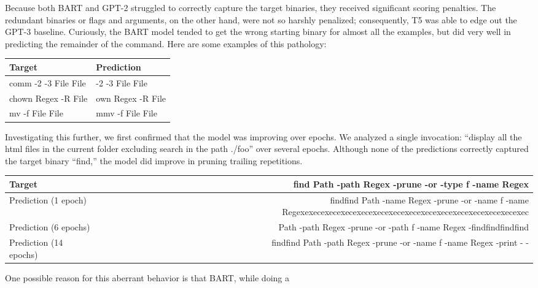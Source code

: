 Because both BART and GPT-2 struggled to correctly capture the target binaries,
they received significant scoring penalties. The redundant binaries or flags
and arguments, on the other hand, were not so harshly penalized; consequently,
T5 was able to edge out the GPT-3 baseline. Curiously, the BART model tended to
get the wrong starting binary for almost all the examples, but did very well in predicting the remainder of the command. Here are some examples of this pathology:
\begin{center}
	\begin{tabular}{ |O|O| }
		\hline
		\textbf{Target}      & \textbf{Prediction} \\
		\hline
		comm -2 -3 File File &
		-2 -3 File File                            \\
		\hline
		chown Regex -R File  &
		own Regex -R File                          \\
		\hline
		mv -f File File      & mmv -f File File    \\
		\hline
	\end{tabular}
\end{center}
Investigating this further, we first confirmed that the model was improving over epochs.
We analyzed a single invocation: ``display all the html files in the current
folder excluding search in the path ./foo'' over several epochs. Although none
of the predictions correctly captured the target binary ``find,'' the model did
improve in pruning trailing repetitions.
\begin{center}
	\begin{tabular}{|M|N|}
		\hline
		Target                 & find Path -path Regex -prune -or -type f -name Regex                                                             \\
		\hline
		Prediction (1 epoch)   & findfind Path -name Regex -prune -or -name f -name Regexexecexecexecexecexecexecexecexecexecexecexecexecexecexec \\
		\hline
		Prediction (6 epochs)  & Path -path Regex -prune -or -path f -name Regex -findfindfindfind                                                \\
		\hline
		Prediction (14 epochs) & findfind Path -path Regex -prune -or -name f -name Regex -print - -                                              \\
		\hline
	\end{tabular}
\end{center}
One possible reason for this aberrant behavior is that BART, while doing a
